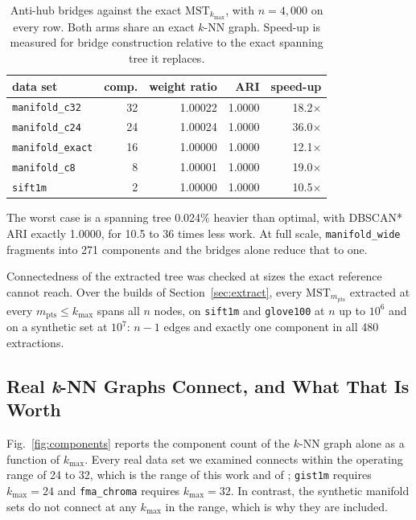 \documentclass{ieeeaccess}
\newcommand{\kmax}{k_{\max}}
\newcommand{\mpts}{m_{\mathrm{pts}}}
\begin{document}
\begin{table}[!t]
\caption{Anti-hub bridges against the exact $\mathrm{MST}_{\kmax}$, with
$n = 4{,}000$ on every row. Both arms share an exact $k$-NN graph. Speed-up is
measured for bridge construction relative to the exact spanning tree it
replaces.}
\label{tab:bridges}
\centering
\footnotesize
\begin{tabular}{@{}lrrrr@{}}
\toprule
data set & comp. & weight ratio & ARI & speed-up \\
\midrule
\texttt{manifold\_c32}  & 32 & 1.00022 & 1.0000 & 18.2$\times$ \\
\texttt{manifold\_c24}  & 24 & 1.00024 & 1.0000 & 36.0$\times$ \\
\texttt{manifold\_exact}& 16 & 1.00000 & 1.0000 & 12.1$\times$ \\
\texttt{manifold\_c8}   & 8  & 1.00001 & 1.0000 & 19.0$\times$ \\
\texttt{sift1m}         & 2  & 1.00000 & 1.0000 & 10.5$\times$ \\
\bottomrule
\end{tabular}
\end{table}

The worst case is a spanning tree 0.024\% heavier than optimal, with DBSCAN*
ARI exactly 1.0000, for 10.5 to 36 times less work. At full scale,
\texttt{manifold\_wide} fragments into 271 components and the bridges alone
reduce that to one.

Connectedness of the extracted tree was checked at sizes the exact reference
cannot reach. Over the builds of Section~\ref{sec:extract}, every
$\mathrm{MST}_{\mpts}$ extracted at every $\mpts \le \kmax$ spans all $n$ nodes,
on \texttt{sift1m} and \texttt{glove100} at $n$ up to $10^6$ and on a synthetic
set at $10^7$: $n - 1$ edges and exactly one component in all 480 extractions.

\subsection{Real \emph{k}-NN Graphs Connect, and What That Is Worth}
\label{sec:connectivity}

Fig.~\ref{fig:components} reports the component count of the $k$-NN graph alone
as a function of $\kmax$. Every real data set we examined connects within the
operating range of 24 to 32, which is the range of this work and of
\cite{coresg}; \texttt{gist1m} requires $\kmax = 24$ and \texttt{fma\_chroma}
requires $\kmax = 32$. In contrast, the synthetic manifold sets do not connect
at any $\kmax$ in the range, which is why they are included.
\end{document}
